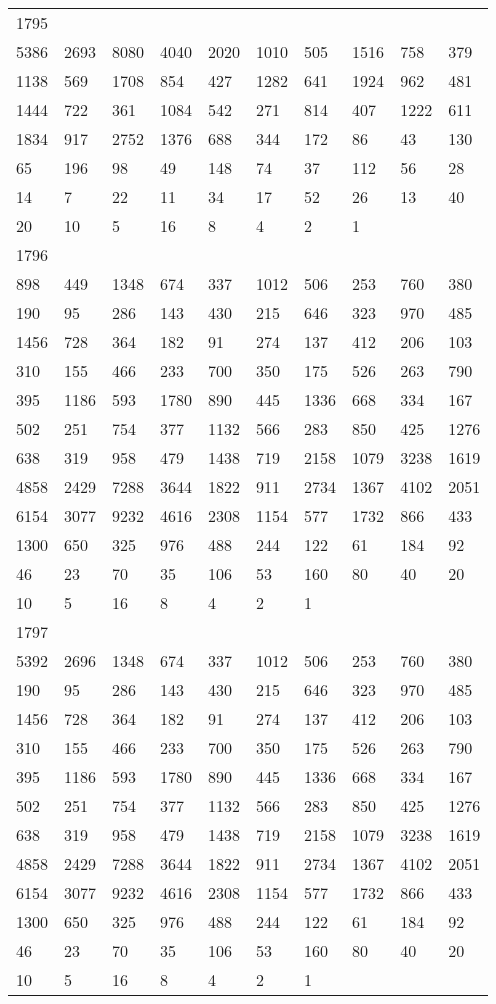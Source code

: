 \begin{longtable}{*{10}{l}}
1795&&&&&&&&&\\
5386& 2693& 8080& 4040& 2020& 1010& 505& 1516& 758& 379\\
1138& 569& 1708& 854& 427& 1282& 641& 1924& 962& 481\\
1444& 722& 361& 1084& 542& 271& 814& 407& 1222& 611\\
1834& 917& 2752& 1376& 688& 344& 172& 86& 43& 130\\
65& 196& 98& 49& 148& 74& 37& 112& 56& 28\\
14& 7& 22& 11& 34& 17& 52& 26& 13& 40\\
20& 10& 5& 16& 8& 4& 2& 1& \\

1796&&&&&&&&&\\
898& 449& 1348& 674& 337& 1012& 506& 253& 760& 380\\
190& 95& 286& 143& 430& 215& 646& 323& 970& 485\\
1456& 728& 364& 182& 91& 274& 137& 412& 206& 103\\
310& 155& 466& 233& 700& 350& 175& 526& 263& 790\\
395& 1186& 593& 1780& 890& 445& 1336& 668& 334& 167\\
502& 251& 754& 377& 1132& 566& 283& 850& 425& 1276\\
638& 319& 958& 479& 1438& 719& 2158& 1079& 3238& 1619\\
4858& 2429& 7288& 3644& 1822& 911& 2734& 1367& 4102& 2051\\
6154& 3077& 9232& 4616& 2308& 1154& 577& 1732& 866& 433\\
1300& 650& 325& 976& 488& 244& 122& 61& 184& 92\\
46& 23& 70& 35& 106& 53& 160& 80& 40& 20\\
10& 5& 16& 8& 4& 2& 1& \\

1797&&&&&&&&&\\
5392& 2696& 1348& 674& 337& 1012& 506& 253& 760& 380\\
190& 95& 286& 143& 430& 215& 646& 323& 970& 485\\
1456& 728& 364& 182& 91& 274& 137& 412& 206& 103\\
310& 155& 466& 233& 700& 350& 175& 526& 263& 790\\
395& 1186& 593& 1780& 890& 445& 1336& 668& 334& 167\\
502& 251& 754& 377& 1132& 566& 283& 850& 425& 1276\\
638& 319& 958& 479& 1438& 719& 2158& 1079& 3238& 1619\\
4858& 2429& 7288& 3644& 1822& 911& 2734& 1367& 4102& 2051\\
6154& 3077& 9232& 4616& 2308& 1154& 577& 1732& 866& 433\\
1300& 650& 325& 976& 488& 244& 122& 61& 184& 92\\
46& 23& 70& 35& 106& 53& 160& 80& 40& 20\\
10& 5& 16& 8& 4& 2& 1& \\


\end{longtable}
